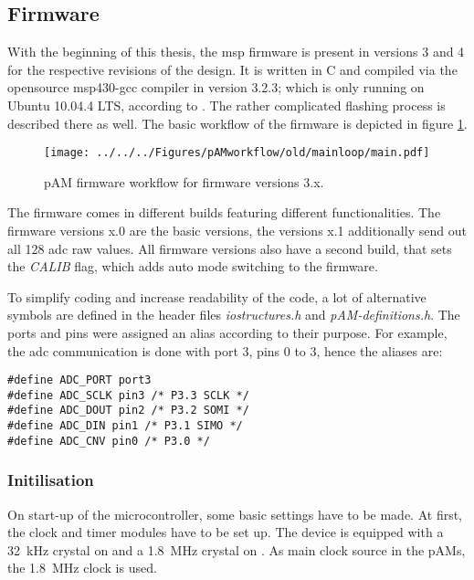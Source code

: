 \subsection{Firmware}
\label{sec:firmwareold}
With the beginning of this thesis, the \ac{msp} firmware is present in versions 3 and 4 for the respective revisions of the design. It is written in C and compiled via the opensource msp430-gcc compiler in version 3.2.3; which is only running on Ubuntu 10.04.4 LTS, according to \cite{agwiki}. The rather complicated flashing process is described there as well. 
The basic workflow of the firmware is depicted in figure \ref{fig:firmware:old:workflow}.\\
\begin{figure}
	\centering
	\texttt{[image: ../../../Figures/pAMworkflow/old/mainloop/main.pdf]}
	\caption{\ac{pAM} firmware workflow for firmware versions 3.x.}
	\label{fig:firmware:old:workflow}
\end{figure}
The firmware comes in different builds featuring different functionalities. The firmware versions x.0 are the basic versions, the versions x.1 additionally send out all 128 \ac{adc} raw values. All firmware versions also have a second build, that sets the \textit{CALIB} flag, which adds auto mode switching to the firmware.

To simplify coding and increase readability of the code, a lot of alternative symbols are defined in the header files \textit{iostructures.h} and \textit{pAM-definitions.h}. 
The ports and pins were assigned an alias according to their purpose. For example, the \ac{adc} communication is done with port 3, pins 0 to 3, hence the aliases are:
\begin{lstlisting}[style=cpp]
#define ADC_PORT port3
#define ADC_SCLK pin3 /* P3.3 SCLK */
#define ADC_DOUT pin2 /* P3.2 SOMI */
#define ADC_DIN pin1 /* P3.1 SIMO */
#define ADC_CNV pin0 /* P3.0 */
\end{lstlisting}


\subsubsection*{Initilisation}
On start-up of the microcontroller, some basic settings have to be made. At first, the clock and timer modules have to be set up. The device is equipped with a \SI{32}{\kilo\hertz} crystal on  and a \SI{1.8}{\mega\hertz} crystal on . As main clock source in the \acp{pAM}, the \SI{1.8}{\mega\hertz} clock is used.

